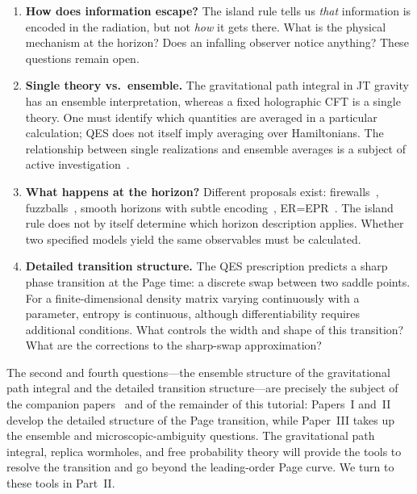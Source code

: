 \documentclass[11pt,letterpaper]{article}
\theoremstyle{plain}
\theoremstyle{definition}
\theoremstyle{remark}
\begin{document}
\begin{enumerate}
\item \textbf{How does information escape?}  The island rule tells us
  \emph{that} information is encoded in the radiation, but not
  \emph{how} it gets there.  What is the physical mechanism at the
  horizon?  Does an infalling observer notice anything?  These
  questions remain open.

\item \textbf{Single theory vs.\ ensemble.}  The gravitational path
  integral in JT gravity has an ensemble interpretation, whereas a fixed
  holographic CFT is a single theory. One must identify which quantities
  are averaged in a particular calculation; QES does not itself imply
  averaging over Hamiltonians.  The relationship between single
  realizations and ensemble averages is a subject of active
  investigation~\citep{saadetal2019, wuebben2026paper3}.

\item \textbf{What happens at the horizon?}  Different proposals
  exist: firewalls~\citep{ampsetal2013}, fuzzballs~\citep{mathur2005},
  smooth horizons with subtle encoding~\citep{papadodimasraju2013},
  ER=EPR~\citep{maldacenasusskind2013}.  The island rule
  does not by itself determine which horizon description applies. Whether
  two specified models yield the same observables must be calculated.

\item \textbf{Detailed transition structure.}  The QES prescription
  predicts a sharp phase transition at the Page time: a discrete
  swap between two saddle points. For a finite-dimensional density matrix
  varying continuously with a parameter, entropy is continuous, although
  differentiability requires additional conditions.  What controls
  the width and shape of this transition?  What are the corrections
  to the sharp-swap approximation?
\end{enumerate}

The second and fourth questions---the ensemble structure of the
gravitational path integral and the detailed transition
structure---are precisely the subject of the companion
papers~\citep{wuebben2026paper1, wuebben2026paper2, wuebben2026paper3}
and of the remainder of this tutorial: Papers~I and~II develop the
detailed structure of the Page transition, while Paper~III takes up
the ensemble and microscopic-ambiguity questions.  The gravitational
path integral, replica wormholes, and
free probability theory will provide the tools to resolve the
transition and go beyond the leading-order Page curve.  We turn to
these tools in Part~II.
\end{document}
